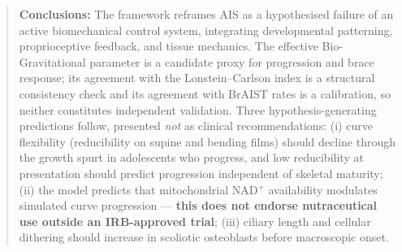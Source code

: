 \begin{abstract}
\noindent\textbf{Conclusions:} The framework reframes AIS as a hypothesised failure of an active biomechanical control system, integrating developmental patterning, proprioceptive feedback, and tissue mechanics. The effective Bio-Gravitational parameter is a candidate proxy for progression and brace response; its agreement with the Lonstein--Carlson index is a structural consistency check and its agreement with BrAIST rates is a calibration, so neither constitutes independent validation. Three hypothesis-generating predictions follow, presented \emph{not} as clinical recommendations: (i) curve flexibility (reducibility on supine and bending films) should decline through the growth spurt in adolescents who progress, and low reducibility at presentation should predict progression independent of skeletal maturity; (ii) the model predicts that mitochondrial NAD$^+$ availability modulates simulated curve progression --- \textbf{this does not endorse nutraceutical use outside an IRB-approved trial}; (iii) ciliary length and cellular dithering should increase in scoliotic osteoblasts before macroscopic onset.
\end{abstract}

